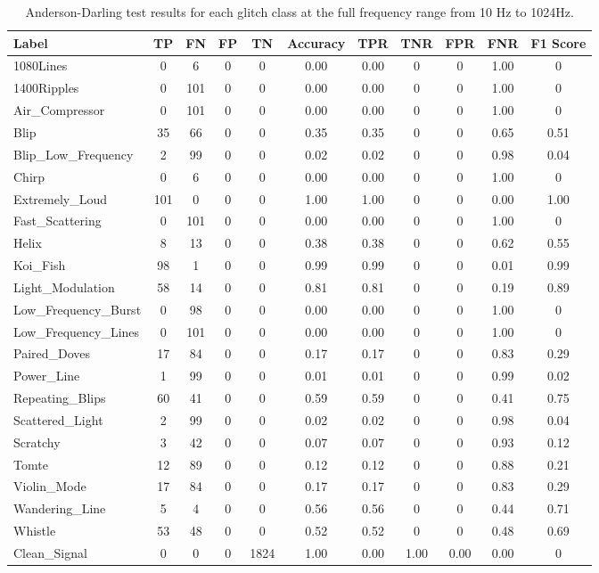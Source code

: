\documentclass[12pt]{article}
\begin{document}
\begin{table}[H]
  \centering
  \begin{tabular}{lcccccccccc}
  \toprule
  Label & TP & FN & FP & TN & Accuracy & TPR & TNR & FPR & FNR & F1 Score \\
  \midrule
  1080Lines & 0 & 6 & 0 & 0 & 0.00 & 0.00 & 0 & 0 & 1.00 & 0 \\
  1400Ripples & 0 & 101 & 0 & 0 & 0.00 & 0.00 & 0 & 0 & 1.00 & 0 \\
  Air\_Compressor & 0 & 101 & 0 & 0 & 0.00 & 0.00 & 0 & 0 & 1.00 & 0 \\
  Blip & 35 & 66 & 0 & 0 & 0.35 & 0.35 & 0 & 0 & 0.65 & 0.51 \\
  Blip\_Low\_Frequency & 2 & 99 & 0 & 0 & 0.02 & 0.02 & 0 & 0 & 0.98 & 0.04 \\
  Chirp & 0 & 6 & 0 & 0 & 0.00 & 0.00 & 0 & 0 & 1.00 & 0 \\
  Extremely\_Loud & 101 & 0 & 0 & 0 & 1.00 & 1.00 & 0 & 0 & 0.00 & 1.00 \\
  Fast\_Scattering & 0 & 101 & 0 & 0 & 0.00 & 0.00 & 0 & 0 & 1.00 & 0 \\
  Helix & 8 & 13 & 0 & 0 & 0.38 & 0.38 & 0 & 0 & 0.62 & 0.55 \\
  Koi\_Fish & 98 & 1 & 0 & 0 & 0.99 & 0.99 & 0 & 0 & 0.01 & 0.99 \\
  Light\_Modulation & 58 & 14 & 0 & 0 & 0.81 & 0.81 & 0 & 0 & 0.19 & 0.89 \\
  Low\_Frequency\_Burst & 0 & 98 & 0 & 0 & 0.00 & 0.00 & 0 & 0 & 1.00 & 0 \\
  Low\_Frequency\_Lines & 0 & 101 & 0 & 0 & 0.00 & 0.00 & 0 & 0 & 1.00 & 0 \\
  Paired\_Doves & 17 & 84 & 0 & 0 & 0.17 & 0.17 & 0 & 0 & 0.83 & 0.29 \\
  Power\_Line & 1 & 99 & 0 & 0 & 0.01 & 0.01 & 0 & 0 & 0.99 & 0.02 \\
  Repeating\_Blips & 60 & 41 & 0 & 0 & 0.59 & 0.59 & 0 & 0 & 0.41 & 0.75 \\
  Scattered\_Light & 2 & 99 & 0 & 0 & 0.02 & 0.02 & 0 & 0 & 0.98 & 0.04 \\
  Scratchy & 3 & 42 & 0 & 0 & 0.07 & 0.07 & 0 & 0 & 0.93 & 0.12 \\
  Tomte & 12 & 89 & 0 & 0 & 0.12 & 0.12 & 0 & 0 & 0.88 & 0.21 \\
  Violin\_Mode & 17 & 84 & 0 & 0 & 0.17 & 0.17 & 0 & 0 & 0.83 & 0.29 \\
  Wandering\_Line & 5 & 4 & 0 & 0 & 0.56 & 0.56 & 0 & 0 & 0.44 & 0.71 \\
  Whistle & 53 & 48 & 0 & 0 & 0.52 & 0.52 & 0 & 0 & 0.48 & 0.69 \\
  Clean\_Signal & 0 & 0 & 0 & 1824 & 1.00 & 0.00 & 1.00 & 0.00 & 0.00 & 0 \\
  \bottomrule
  \end{tabular}
  \caption{Anderson-Darling test results for each glitch class at the full frequency range from 10 Hz to 1024Hz.}
  \label{tab:ad_full_range_results}
\end{table}
\end{document}
